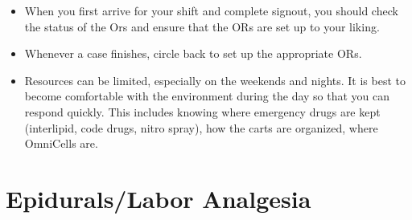 \documentclass[twoside,8pt]{extarticle}
\providecommand{\tightlist}{%
}
\begin{document}
\begin{itemize}
\tightlist
\item
  When you first arrive for your shift and complete signout, you should
  check the status of the Ors and ensure that the ORs are set up to your
  liking.
\item
  Whenever a case finishes, circle back to set up the appropriate ORs.
\item
  Resources can be limited, especially on the weekends and nights. It is
  best to become comfortable with the environment during the day so that
  you can respond quickly. This includes knowing where emergency drugs
  are kept (interlipid, code drugs, nitro spray), how the carts are
  organized, where OmniCells are.
\end{itemize}

\section{Epidurals/Labor Analgesia}\label{epiduralslabor-analgesia}
\end{document}
